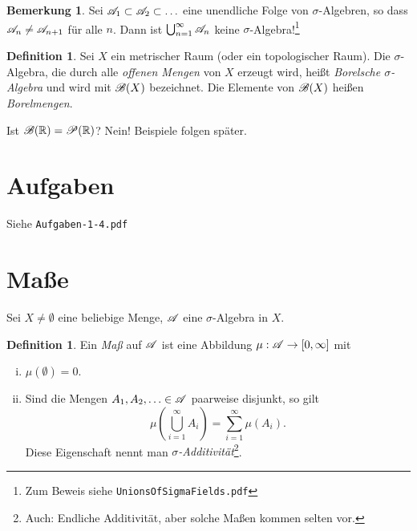 \documentclass[
 a4paper,
 12pt,
 parskip=half
 ]{scrreprt}
\theoremstyle{plain}
\theoremstyle{definition}
\newtheorem{defn}[thm]{Definition} %
\newtheorem{rmrk}[thm]{Bemerkung} %
\numberwithin{equation}{section}
\begin{document}
\begin{rmrk}
 Sei $\mathscr{A}_1 \subset \mathscr{A}_2 \subset \ldots$ eine unendliche Folge von $\sigma$-Algebren, so dass $\mathscr{A}_n \ne \mathscr{A}_{n+1}$ für alle $n$. Dann ist $\bigcup_{n=1}^{\infty} \mathscr{A}_n$ keine $\sigma$-Algebra!\footnote{Zum Beweis siehe \texttt{UnionsOfSigmaFields.pdf}}
\end{rmrk}

\begin{defn}
 Sei $X$ ein metrischer Raum (oder ein topologischer Raum). Die $\sigma$-Algebra, die durch alle \emph{offenen Mengen} von $X$ erzeugt wird, heißt \emph{Borelsche $\sigma$-Algebra} und wird mit $\mathscr{B}(X)$ bezeichnet. Die Elemente von $\mathscr{B}(X)$ heißen \emph{Borelmengen}.
\end{defn}

Ist $\mathscr{B}(\mathbb{R}) = \mathscr{P}(\mathbb{R})$? Nein! Beispiele folgen später.

\section{Aufgaben}
Siehe \verb+Aufgaben-1-4.pdf+

\section{Maße}
Sei $X \ne \emptyset$ eine beliebige Menge, $\mathscr{A}$ eine $\sigma$-Algebra in $X$.

\begin{defn}
 Ein \emph{Maß} auf $\mathscr{A}$ ist eine Abbildung $\mu: \mathscr{A} \to [0,\infty]$ mit
 \begin{enumerate}[(i)]
  \item $\mu( \emptyset ) = 0$.
  \item Sind die Mengen $A_1, A_2, \ldots \in \mathscr{A}$ paarweise disjunkt, so gilt
  \[ \mu\left( \bigcup_{i=1}^\infty A_i \right) = \sum_{i=1}^\infty \mu(A_i). \]
  Diese Eigenschaft nennt man \emph{$\sigma$-Additivität}\footnote{Auch: Endliche Additivität, aber solche Maßen kommen selten vor.}.
 \end{enumerate}
\end{defn}
\end{document}
